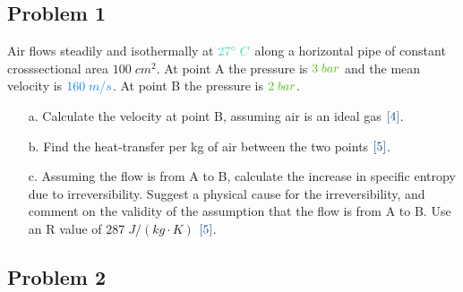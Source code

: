 \documentclass[
  twocolumn,
  landscape]{report}
\begin{document}
\hypertarget{problem-1}{%
\subsection{Problem 1}\label{problem-1}}

Air flows steadily and isothermally at
\({\color[rgb]{0.164799,0.878862,0.723179}27^{\circ} \; C}\) along a
horizontal pipe of constant crosssectional area \(100 \; cm^2\). At
point A the pressure is
\({\color[rgb]{0.315209,0.728565,0.037706}3 \; bar}\) and the mean
velocity is \({\color[rgb]{0.059472,0.501943,0.998465}160 \; m/s}\). At
point B the pressure is
\({\color[rgb]{0.315209,0.728565,0.037706}2 \; bar}\).

\begin{enumerate}

\item[a.] Calculate the velocity at point B, assuming air is an ideal gas ${\color[rgb]{0.028509,0.250925,0.501969}[4]}$.  

\vspace{3 cm}

\item [b.]Find the heat-transfer per kg of air between the two points ${\color[rgb]{0.028509,0.250925,0.501969}[5]}$. 

\vspace{4 cm}

\item [c.] Assuming the flow is from A to B, calculate the increase in specific entropy due to irreversibility.  Suggest a physical cause for the irreversibility, and comment on the validity of the assumption that the flow is from A to B. Use an R value of $287 \; J /\left( kg \cdot K \right)$ ${\color[rgb]{0.028509,0.250925,0.501969}[5]}$.  

\vspace{6 cm}
\end{enumerate}

\hfill\break

\vspace{4 cm}

\hypertarget{problem-2}{%
\subsection{Problem 2}\label{problem-2}}
\end{document}
